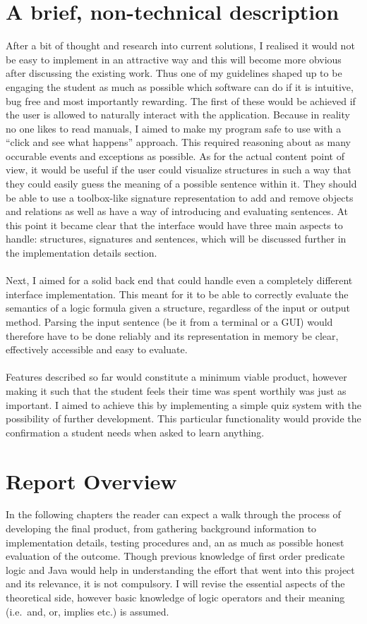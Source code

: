 \documentclass{report}
\begin{document}
\section{A brief, non-technical description}
After a bit of thought and research into current solutions, I realised it would not be easy to implement in an attractive way and this will become more obvious after discussing the existing work. Thus one of my guidelines shaped up to be engaging the student as much as possible which software can do if it is intuitive, bug free and most importantly rewarding. The first of these would be achieved if the user is allowed to naturally interact with the application. Because in reality no one likes to read manuals, I aimed to make my program safe to use with a ``click and see what happens'' approach. This required reasoning about as many occurable events and exceptions as possible. As for the actual content point of view, it would be useful if the user could visualize structures in such a way that they could easily guess the meaning of a possible sentence within it. They should be able to use a toolbox-like signature representation to add and remove objects and relations as well as have a way of introducing and evaluating sentences. At this point it became clear that the interface would have three main aspects to handle: structures, signatures and sentences, which will be discussed further in the implementation details section. \\ \\
Next, I aimed for a solid back end that could handle even a completely different interface implementation. This meant for it to be able to correctly evaluate the semantics of a logic formula given a structure, regardless of the input or output method. Parsing the input sentence (be it from a terminal or a GUI) would therefore have to be done reliably and its representation in memory be clear, effectively accessible and easy to evaluate. \\ \\
Features described so far would constitute a minimum viable product, however making it such that the student feels their time was spent worthily was just as important. I aimed to achieve this by implementing a simple quiz system with the possibility of further development. This particular functionality would provide the confirmation a student needs when asked to learn anything.

\section{Report Overview}
In the following chapters the reader can expect a walk through the process of developing the final product, from gathering background information to implementation details, testing procedures and, an as much as possible honest evaluation of the outcome. Though previous knowledge of first order predicate logic and Java would help in understanding the effort that went into this project and its relevance, it is not compulsory. I will revise the essential aspects of the theoretical side, however basic knowledge of logic operators and their meaning (i.e.\ and, or, implies etc.) is assumed.
\end{document}
